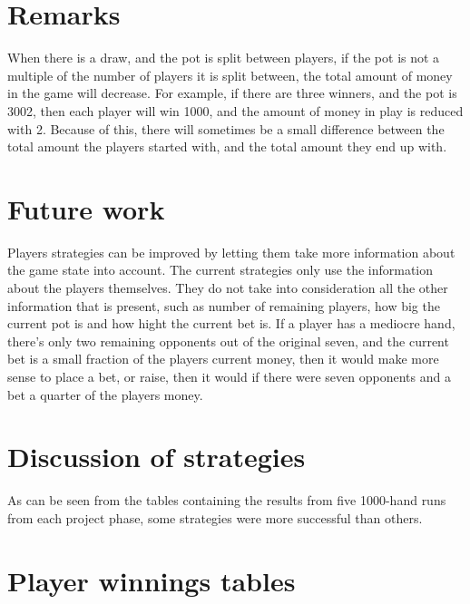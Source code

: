 \documentclass[titlepage]{article}
\begin{document}
\section{Remarks}
    When there is a draw, and the pot is split between players, if the pot is not a multiple of the number of players it is split between, the total amount of money in the game will decrease. For example, if there are three winners, and the pot is 3002, then each player will win 1000, and the amount of money in play is reduced with 2. Because of this, there will sometimes be a small difference between the total amount the players started with, and the total amount they end up with.
    		
\section{Future work}
	Players strategies can be improved by letting them take more information about the game state into account. The current strategies only use the information about the players themselves. They do not take into consideration all the other information that is present, such as number of remaining players, how big the current pot is and how hight the current bet is. If a player has a mediocre hand, there's only two remaining opponents out of the original seven, and the current bet is a small fraction of the players current money, then it would make more sense to place a bet, or raise, then it would if there were seven opponents and a bet a quarter of the players money.
	
\section{Discussion of strategies}
    As can be seen from the tables containing the results from five 1000-hand runs from each project phase, some strategies were more successful than others.

\section{Player winnings tables}
\end{document}
